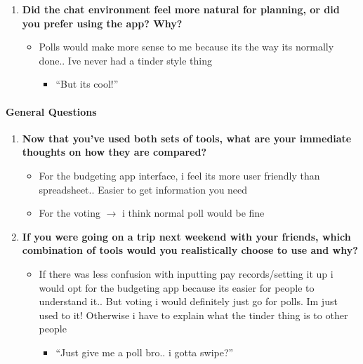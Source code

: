 \documentclass[12pt,a4paper]{article}
\begin{document}
\begin{enumerate}
    \item \textbf{Did the chat environment feel more natural for planning, or did you prefer using the app? Why?}
    
    \begin{itemize}
        \item Polls would make more sense to me because its the way its normally done.. Ive never had a tinder style thing
        \begin{itemize}
            \item ``But its cool!''
        \end{itemize}
    \end{itemize}
\end{enumerate}

\paragraph{General Questions}

\begin{enumerate}
    \item \textbf{Now that you've used both sets of tools, what are your immediate thoughts on how they are compared?}
    
    \begin{itemize}
        \item For the budgeting app interface, i feel its more user friendly than spreadsheet.. Easier to get information you need
        \item For the voting $\rightarrow$ i think normal poll would be fine
    \end{itemize}
    
    \item \textbf{If you were going on a trip next weekend with your friends, which combination of tools would you realistically choose to use and why?}
    
    \begin{itemize}
        \item If there was less confusion with inputting pay records/setting it up i would opt for the budgeting app because its easier for people to understand it.. But voting i would definitely just go for polls. Im just used to it! Otherwise i have to explain what the tinder thing is to other people
        \begin{itemize}
            \item ``Just give me a poll bro.. i gotta swipe?''
        \end{itemize}
    \end{itemize}
\end{enumerate}
\end{document}
